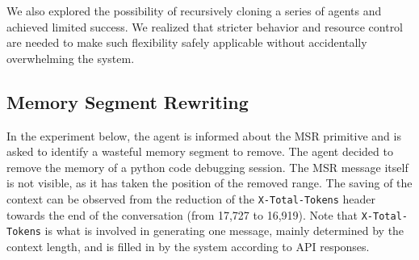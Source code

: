 We also explored the possibility of recursively cloning a series of agents and achieved limited success. We realized that stricter behavior and resource control are needed to make such flexibility safely applicable without accidentally overwhelming the system.

\subsection{Memory Segment Rewriting}

In the experiment below, the agent is informed about the MSR primitive and is asked to identify a wasteful memory segment to remove. The agent decided to remove the memory of a python code debugging session. The MSR message itself is not visible, as it has taken the position of the removed range. The saving of the context can be observed from the reduction of the \texttt{X-Total-Tokens} header towards the end of the conversation (from 17,727 to 16,919).  Note that \texttt{X-Total-Tokens} is what is involved in generating one message, mainly determined by the context length, and is filled in by the system according to API responses. 

